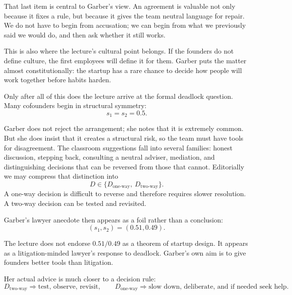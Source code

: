 That last item is central to Garber's view. An agreement is valuable not only because it fixes a rule, but because it gives the team neutral language for repair. We do not have to begin from accusation; we can begin from what we previously said we would do, and then ask whether it still works.

This is also where the lecture's cultural point belongs. If the founders do not define culture, the first employees will define it for them. Garber puts the matter almost constitutionally: the startup has a rare chance to decide how people will work together before habits harden.

Only after all of this does the lecture arrive at the formal deadlock question. Many cofounders begin in structural symmetry:
\begin{equation}
s_1 = s_2 = 0.5.
\end{equation}

Garber does not reject the arrangement; she notes that it is extremely common. But she does insist that it creates a structural risk, so the team must have tools for disagreement. The classroom suggestions fall into several families: honest discussion, stepping back, consulting a neutral adviser, mediation, and distinguishing decisions that can be reversed from those that cannot. Editorially we may compress that distinction into
\begin{equation}
D \in \{D_{\text{one-way}},\ D_{\text{two-way}}\}.
\end{equation}
A one-way decision is difficult to reverse and therefore requires slower resolution. A two-way decision can be tested and revisited.

Garber's lawyer anecdote then appears as a foil rather than a conclusion:
\begin{equation}
(s_1,s_2) = (0.51,0.49).
\end{equation}

\begin{remark}
The lecture does not endorse \(0.51/0.49\) as a theorem of startup design. It appears as a litigation-minded lawyer's response to deadlock. Garber's own aim is to give founders better tools than litigation.
\end{remark}

Her actual advice is much closer to a decision rule:
\begin{equation}
D_{\text{two-way}} \Rightarrow \text{test, observe, revisit}, \qquad
D_{\text{one-way}} \Rightarrow \text{slow down, deliberate, and if needed seek help}.
\end{equation}


